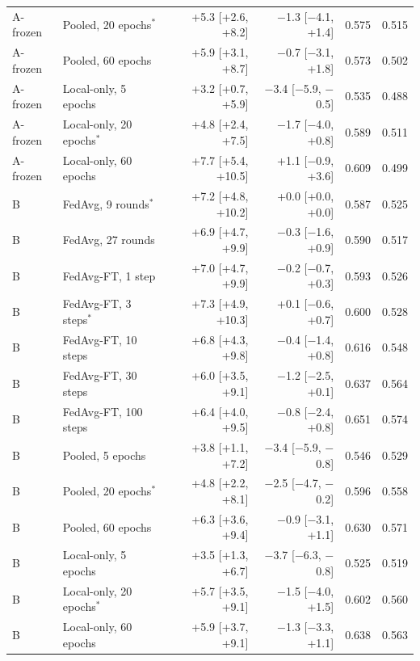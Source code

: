 \documentclass[10pt]{article}
\begin{document}
\begin{table}[!htbp]
\begin{tabular}{@{}llrrrr@{}}
A-frozen & Pooled, 20 epochs$^*$ & +5.3 [+2.6, +8.2] & $-$1.3 [$-$4.1, +1.4] & 0.575 & 0.515 \\
A-frozen & Pooled, 60 epochs & +5.9 [+3.1, +8.7] & $-$0.7 [$-$3.1, +1.8] & 0.573 & 0.502 \\
A-frozen & Local-only, 5 epochs & +3.2 [+0.7, +5.9] & $-$3.4 [$-$5.9, $-$0.5] & 0.535 & 0.488 \\
A-frozen & Local-only, 20 epochs$^*$ & +4.8 [+2.4, +7.5] & $-$1.7 [$-$4.0, +0.8] & 0.589 & 0.511 \\
A-frozen & Local-only, 60 epochs & +7.7 [+5.4, +10.5] & +1.1 [$-$0.9, +3.6] & 0.609 & 0.499 \\
\midrule
B & FedAvg, 9 rounds$^*$ & +7.2 [+4.8, +10.2] & +0.0 [+0.0, +0.0] & 0.587 & 0.525 \\
B & FedAvg, 27 rounds & +6.9 [+4.7, +9.9] & $-$0.3 [$-$1.6, +0.9] & 0.590 & 0.517 \\
B & FedAvg-FT, 1 step & +7.0 [+4.7, +9.9] & $-$0.2 [$-$0.7, +0.3] & 0.593 & 0.526 \\
B & FedAvg-FT, 3 steps$^*$ & +7.3 [+4.9, +10.3] & +0.1 [$-$0.6, +0.7] & 0.600 & 0.528 \\
B & FedAvg-FT, 10 steps & +6.8 [+4.3, +9.8] & $-$0.4 [$-$1.4, +0.8] & 0.616 & 0.548 \\
B & FedAvg-FT, 30 steps & +6.0 [+3.5, +9.1] & $-$1.2 [$-$2.5, +0.1] & 0.637 & 0.564 \\
B & FedAvg-FT, 100 steps & +6.4 [+4.0, +9.5] & $-$0.8 [$-$2.4, +0.8] & 0.651 & 0.574 \\
B & Pooled, 5 epochs & +3.8 [+1.1, +7.2] & $-$3.4 [$-$5.9, $-$0.8] & 0.546 & 0.529 \\
B & Pooled, 20 epochs$^*$ & +4.8 [+2.2, +8.1] & $-$2.5 [$-$4.7, $-$0.2] & 0.596 & 0.558 \\
B & Pooled, 60 epochs & +6.3 [+3.6, +9.4] & $-$0.9 [$-$3.1, +1.1] & 0.630 & 0.571 \\
B & Local-only, 5 epochs & +3.5 [+1.3, +6.7] & $-$3.7 [$-$6.3, $-$0.8] & 0.525 & 0.519 \\
B & Local-only, 20 epochs$^*$ & +5.7 [+3.5, +9.1] & $-$1.5 [$-$4.0, +1.5] & 0.602 & 0.560 \\
B & Local-only, 60 epochs & +5.9 [+3.7, +9.1] & $-$1.3 [$-$3.3, +1.1] & 0.638 & 0.563 \\
\bottomrule
\end{tabular}
\end{table}
\end{document}

